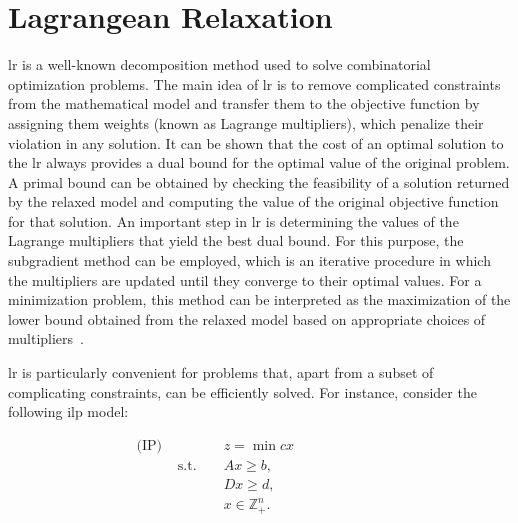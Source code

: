 
\section{Lagrangean Relaxation}\label{sec:cbrp-lagrangean-relaxation}

\gls{lr} is a well-known decomposition method used to solve combinatorial
optimization problems. The main idea of \gls{lr} is to remove complicated
constraints from the mathematical model and transfer them to the objective
function by assigning them weights (known as Lagrange multipliers), which
penalize their violation in any solution. It can be shown that the cost of an
optimal solution to the \gls{lr} always provides a dual bound for the optimal
value of the original problem. A primal bound can be obtained by checking the
feasibility of a solution returned by the relaxed model and computing the value
of the original objective function for that solution. An important step in
\gls{lr} is determining the values of the Lagrange multipliers that yield the
best dual bound. For this purpose, the subgradient method can be employed, which
is an iterative procedure in which the multipliers are updated until they
converge to their optimal values. For a minimization problem, this method can be
interpreted as the maximization of the lower bound obtained from the relaxed
model based on appropriate choices of multipliers~\cite{Beasley:1993}.

\gls{lr} is particularly convenient for problems that, apart from a subset of
complicating constraints, can be efficiently solved. For instance, consider the
following \gls{ilp} model:

\begin{align*}
	\text{(IP) } &              &  & z = \min cx           &  &  &  &  &  &  &  &   \\
	             & \text{s.t. } &  & Ax \geq b,            &  &  &  &  &  &  &  &   \\
	             &              &  & Dx \geq d,            &  &  &  &  &  &  &  &   \\
	             &              &  & x \in \mathbb{Z}^n_+. &  &  &  &  &  &  &  & 
\end{align*}

